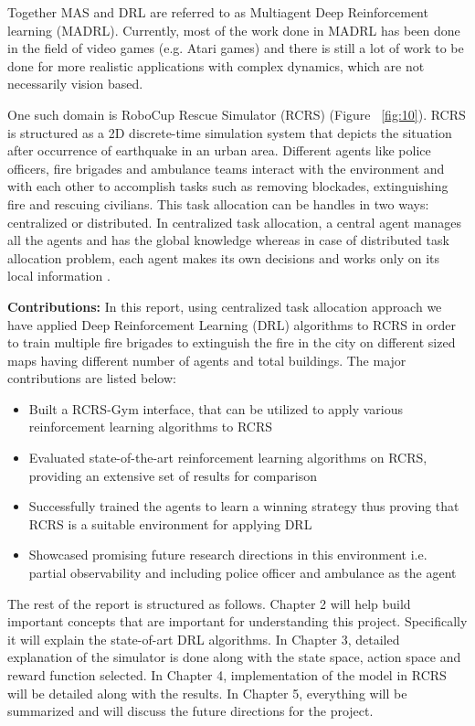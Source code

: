 \documentclass[12pt]{report}
\begin{document}
Together MAS and DRL are referred to as Multiagent Deep Reinforcement learning (MADRL). Currently, most of the work done in MADRL has been done in the field of video games (e.g. Atari games) and there is still a lot of work to be done for more realistic applications with complex dynamics, which are not necessarily vision based. 

One such domain is RoboCup Rescue Simulator (RCRS) (Figure ~\ref{fig:10}). RCRS is structured as a 2D discrete-time simulation system that depicts the situation after occurrence of earthquake in an urban area. Different agents like police officers, fire brigades and ambulance teams interact with the environment and with each other to accomplish tasks such as removing blockades, extinguishing fire and rescuing civilians. This task allocation can be handles in two ways: centralized or distributed. In centralized task allocation, a central agent manages all the agents and has the global knowledge whereas in case of distributed task allocation problem, each agent makes its own decisions and works only on its local information \cite{Nair}. 

\textbf{Contributions:} In this report, using centralized task allocation approach we have applied Deep Reinforcement Learning (DRL) algorithms to RCRS in order to train multiple fire brigades to extinguish the fire in the city on different sized maps having different number of agents and total buildings. The major contributions are listed below: 

\begin{itemize}
    \item Built a RCRS-Gym interface, that can be utilized to apply various reinforcement learning algorithms to RCRS
    \item Evaluated state-of-the-art reinforcement learning algorithms on RCRS, providing an extensive set of results for comparison
    \item Successfully trained the agents to learn a winning strategy thus proving that RCRS is a suitable environment for applying DRL 
    \item Showcased promising future research directions in this environment i.e. partial observability and including police officer and ambulance as the agent
\end{itemize}

The rest of the report is structured as follows. Chapter 2 will help build important concepts that are important for understanding this project. Specifically it will explain the state-of-art DRL algorithms. In Chapter 3, detailed explanation of the simulator is done along with the state space, action space and reward function selected. In Chapter 4, implementation of the model in RCRS will be detailed along with the results. In Chapter 5, everything will be summarized and will discuss the future directions for the project. 
\end{document}
